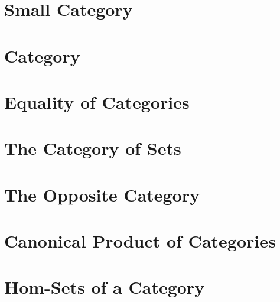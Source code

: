 \section{Small Category}
    
\section{Category}
    
\section{Equality of Categories}
    
\section{The Category of Sets}
    
\section{The Opposite Category}
    
\section{Canonical Product of Categories}
    
\section{Hom-Sets of a Category}
    
